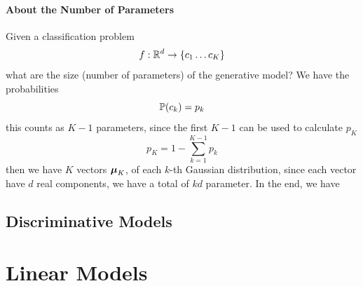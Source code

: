 \documentclass[10pt, letterpaper]{report}
\begin{document}
\subsubsection{About the Number of Parameters}
Given a classification problem$$f:{\mathbb R}^d\rightarrow\{c_1\dots c_K\}$$
what are the size (number of parameters) of the generative model? We have the probabilities$${\mathbb P}(c_k)=p_k $$ this counts as $K-1$ parameters, since the first $K-1$ can be used to calculate $p_K$\begin{equation}
    p_K=1-\sum_{k=1}^{K-1}p_k
\end{equation}
then we have $K$ vectors ${\boldsymbol{\mu}}_K$, of each $k$-th Gaussian distribution, since each vector have $d$ real components, we have a total of $kd$ parameter. In the end, we have 
\section{Discriminative Models}
\chapter{Linear Models}
\end{document}
